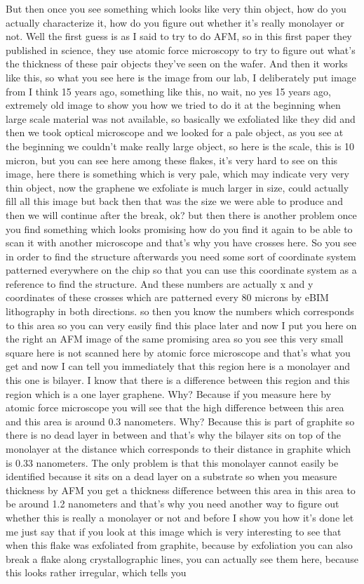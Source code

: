But then once you see something which looks like very thin object, how do you actually characterize it, how do you figure out whether it's really monolayer or not. Well the first guess is as I said to try to do AFM, so in this first paper they published in science, they use atomic force microscopy to try to figure out what's the thickness of these pair objects they've seen on the wafer. And then it works like this, so what you see here is the image from our lab, I deliberately put image from I think 15 years ago, something like this, no wait, no yes 15 years ago, extremely old image to show you how we tried to do it at the beginning when large scale material was not available, so basically we exfoliated like they did and then we took optical microscope and we looked for a pale object, as you see at the beginning we couldn't make really large object, so here is the scale, this is 10 micron, but you can see here among these flakes, it's very hard to see on this image, here there is something which is very pale, which may indicate very very thin object, now the graphene we exfoliate is much larger in size, could actually fill all this image but back then that was the size we were able to produce and then we will continue after the break, ok? but then there is another problem once you find something which looks promising how do you find it again to be able to scan it with another microscope and that's why you have crosses here. So you see in order to find the structure afterwards you need some sort of coordinate system patterned everywhere on the chip so that you can use this coordinate system as a reference to find the structure. And these numbers are actually x and y coordinates of these crosses which are patterned every 80 microns by eBIM lithography in both directions. so then you know the numbers which corresponds to this area so you can very easily find this place later and now I put you here on the right an AFM image of the same promising area so you see this very small square here is not scanned here by atomic force microscope and that's what you get and now I can tell you immediately that this region here is a monolayer and this one is bilayer. I know that there is a difference between this region and this region which is a one layer graphene. Why? Because if you measure here by atomic force microscope you will see that the high difference between this area and this area is around 0.3 nanometers. Why? Because this is part of graphite so there is no dead layer in between and that's why the bilayer sits on top of the monolayer at the distance which corresponds to their distance in graphite which is 0.33 nanometers. The only problem is that this monolayer cannot easily be identified because it sits on a dead layer on a substrate so when you measure thickness by AFM you get a thickness difference between this area in this area to be around 1.2 nanometers and that's why you need another way to figure out whether this is really a monolayer or not and before I show you how it's done let me just say that if you look at this image which is very interesting to see that when this flake was exfoliated from graphite, because by exfoliation you can also break a flake along crystallographic lines, you can actually see them here, because this looks rather irregular, which tells you 